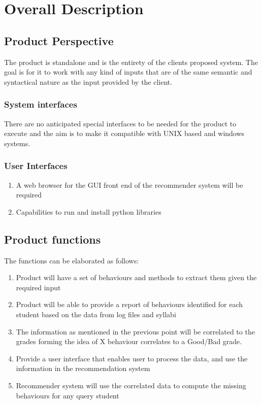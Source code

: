 \documentclass[12pt]{article}
\begin{document}
	\section{Overall Description} \label{desc}
	\subsection{Product Perspective}
	The product is standalone and is the entirety of the clients proposed system. The goal is for it to work with any kind of inputs that are of the same semantic and syntactical nature as the input provided by the client. 
	\subsubsection{System interfaces}
	There are no anticipated special interfaces to be needed for the product to execute and the aim is to make it compatible with UNIX based and windows systems.
	\subsubsection{User Interfaces}
	\begin{enumerate}
		\item A web browser for the GUI front end of the recommender system will be required
		\item Capabilities to run and install python libraries
	\end{enumerate}

	\subsection{Product functions}
	The functions can be elaborated as follows:
	\begin{enumerate}
		\item Product will have a set of behaviours and methods to extract them given the required input
		\item Product will be able to provide a report of behaviours identified for each student based on the data from log files and syllabi
		\item The information as mentioned in the previous point will be correlated to the grades forming the idea of X behaviour correlates to a Good/Bad grade.
		\item Provide a user interface that enables user to process the data, and use the information in the recommendation system
		\item Recommender system will use the correlated data to compute the missing behaviours for any query student
	\end{enumerate}
\end{document}
